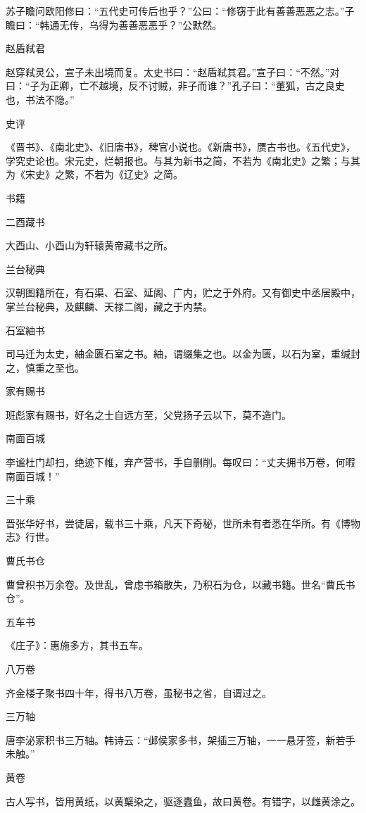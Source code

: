 \documentclass[a4paper,12pt,UTF8,twoside]{ctexbook}
\begin{document}
    苏子瞻问欧阳修曰：“五代史可传后也乎？”公曰：“修窃于此有善善恶恶之志。”子瞻曰：“韩通无传，乌得为善善恶恶乎？”公默然。
    
    赵盾弒君
    
    赵穿弒灵公，宣子未出境而复。太史书曰：“赵盾弒其君。”宣子曰：“不然。”对曰：“子为正卿，亡不越境，反不讨贼，非子而谁？”孔子曰：“董狐，古之良史也，书法不隐。”
    
    史评
    
    《晋书》、《南北史》、《旧唐书》，稗官小说也。《新唐书》，赝古书也。《五代史》，学究史论也。宋元史，烂朝报也。与其为新书之简，不若为《南北史》之繁；与其为《宋史》之繁，不若为《辽史》之简。
    
    书籍
    
    二酉藏书
    
    大酉山、小酉山为轩辕黄帝藏书之所。
    
    兰台秘典
    
    汉朝图籍所在，有石渠、石室、延阁、广内，贮之于外府。又有御史中丞居殿中，掌兰台秘典，及麒麟、天禄二阁，藏之于内禁。
    
    石室紬书
    
    司马迁为太史，紬金匮石室之书。紬，谓缀集之也。以金为匮，以石为室，重缄封之，慎重之至也。
    
    家有赐书
    
    班彪家有赐书，好名之士自远方至，父党扬子云以下，莫不造门。
    
    南面百城
    
    李谧杜门却扫，绝迹下帷，弃产营书，手自删削。每叹曰：“丈夫拥书万卷，何暇南面百城！”
    
    三十乘
    
    晋张华好书，尝徒居，载书三十乘，凡天下奇秘，世所未有者悉在华所。有《博物志》行世。
    
    曹氏书仓
    
    曹曾积书万余卷。及世乱，曾虑书箱散失，乃积石为仓，以藏书籍。世名“曹氏书仓”。
    
    五车书
    
    《庄子》：惠施多方，其书五车。
    
    八万卷
    
    齐金楼子聚书四十年，得书八万卷，虽秘书之省，自谓过之。
    
    三万轴
    
    唐李泌家积书三万轴。韩诗云：“邺侯家多书，架插三万轴，一一悬牙签，新若手未触。”
    
    黄卷
    
    古人写书，皆用黄纸，以黄櫱染之，驱逐蠹鱼，故曰黄卷。有错字，以雌黄涂之。
    
\end{document}
